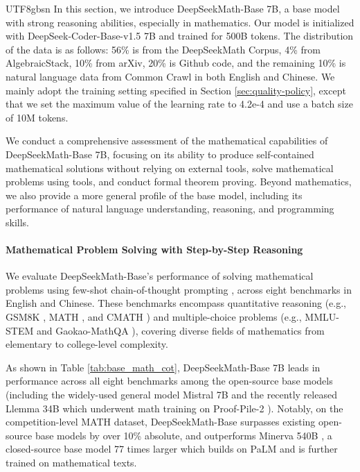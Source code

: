 \documentclass[11pt, a4paper, logo, copyright, nonumbering]{deepseek}
\newcommand{\spmath}{DeepSeekMath}
\begin{document}
\begin{CJK*}{UTF8}{gbsn}
In this section, we introduce \spmath-Base 7B, a base model with strong reasoning abilities, especially in mathematics.
Our model is initialized with DeepSeek-Coder-Base-v1.5 7B \citep{deepseek-coder} and trained for 500B tokens. The distribution of the data  is as follows: 56\% is from the DeepSeekMath Corpus, 4\% from AlgebraicStack, 10\% from arXiv, 20\% is Github code, and the remaining 10\% is natural language data from Common Crawl in both English and Chinese.
We mainly adopt the training setting specified in Section \ref{sec:quality-policy}, except that we set the maximum value of the learning rate to 4.2e-4 and use a batch size of 10M tokens.

We conduct a comprehensive assessment of the mathematical capabilities of \spmath-Base 7B, focusing on its ability to produce self-contained mathematical solutions without relying on external tools, solve mathematical problems using tools, and conduct formal theorem proving.
Beyond mathematics, we also provide a more general profile of the base model, including its performance of natural language understanding, reasoning, and programming skills.

\paragraph{Mathematical Problem Solving with Step-by-Step Reasoning}

We evaluate \spmath-Base's performance of solving mathematical problems using few-shot chain-of-thought prompting \citep{cot}, across eight benchmarks in English and Chinese.
These benchmarks encompass quantitative reasoning (e.g., GSM8K \citep{gsm8k}, MATH \citep{MATH}, and CMATH \citep{wei2023cmath}) and multiple-choice problems (e.g., MMLU-STEM \citep{mmlu} and Gaokao-MathQA \citep{agieval}), covering diverse fields of mathematics from elementary to college-level complexity.

As shown in Table \ref{tab:base_math_cot}, \spmath-Base 7B leads in performance across all eight benchmarks among the open-source base models (including the widely-used general model Mistral 7B \citep{mistral} and the recently released Llemma 34B \citep{llemma} which underwent math training on Proof-Pile-2 \citep{llemma}).
Notably, on the competition-level MATH dataset, \spmath-Base surpasses existing open-source base models by over 10\% absolute, and outperforms Minerva 540B \citep{minerva}, a closed-source base model 77 times larger which builds on PaLM \citep{palm} and is further trained on mathematical texts.


\end{CJK*}
\end{document}
